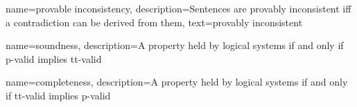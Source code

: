 {    name={provable inconsistency}, 
  description={Sentences are provably inconsistent iff a contradiction can be derived from them},
    text={provably inconsistent}
}


{
name=soundness,
description={A property held by logical systems if and only if p-valid implies tt-valid}
}


{
name=completeness,
description={A property held by logical systems if and only if tt-valid implies p-valid}
}



